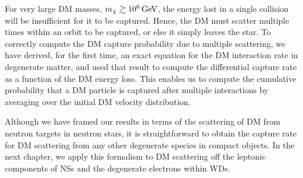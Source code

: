 For very large DM masses, $m_\chi\gtrsim10^6{\rm \,GeV}$, the energy lost in a single collision will be insufficient for it to be captured. Hence, the DM must scatter multiple times within an orbit to be captured, or else it simply leaves the star. To correctly compute the DM capture probability due to multiple scattering, we have derived, for the first time, an exact equation for the DM interaction rate in degenerate matter, and used that result to compute the differential capture rate as a function of the DM energy loss. This enables us to compute the cumulative probability that a DM particle is captured after multiple interactions by averaging over the initial DM velocity distribution.


Although we have framed our results in terms of the scattering of DM from neutron targets in neutron stars, it is straightforward to obtain the capture rate for DM scattering from any other degenerate species in compact objects. In the next chapter, we apply this formalism to DM scattering off the leptonic components of NSs and the degenerate electrons within WDs.

